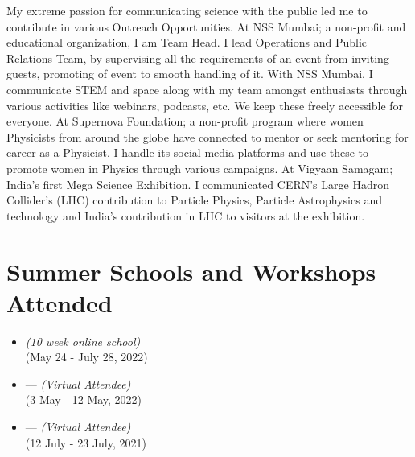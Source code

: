 \documentclass{My_CV}
\begin{document}
\begin{paracol}{2}
\begin{rightcolumn}
\begin{itemize}
\end{itemize}

My extreme passion for communicating science with the public led me to contribute in various Outreach Opportunities. At NSS Mumbai; a non-profit and educational organization, I am Team Head. I lead Operations and Public Relations Team, by supervising all the requirements of an event from inviting guests, promoting of event to smooth handling of it. With NSS Mumbai, I communicate STEM and space along with my team amongst enthusiasts through various activities like webinars, podcasts, etc. We keep these freely accessible for everyone. At Supernova Foundation; a non-profit program where women Physicists from around the globe have connected to mentor or seek mentoring for career as a Physicist. I handle its social media platforms and use these to promote women in Physics through various campaigns. At Vigyaan Samagam; India’s first Mega Science Exhibition. I communicated CERN’s Large Hadron Collider's (LHC) contribution to Particle Physics, Particle Astrophysics and technology and India’s contribution in LHC to visitors at the exhibition.



\section{{\faHourglass[2]} Summer Schools and Workshops Attended}

\begin{itemize}

    \item {} \textit{(10 week online school)} \\
     \hfill{(May 24 - July 28, 2022)} \\
    
    \item {} — \textit{(Virtual Attendee)} \\
     \hfill{(3 May - 12 May, 2022)}
    
    \item {} — \textit{(Virtual Attendee)} \\
     \hfill{(12 July - 23 July, 2021)}
    

\end{itemize}
\end{rightcolumn}
\end{paracol}
\end{document}
